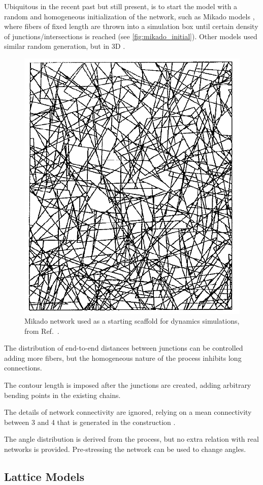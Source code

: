 Ubiquitous in the recent past but still present, is to start the model with a random and homogeneous initialization of the network, such as Mikado models \cite{wilhelm_elasticity_2003, astrom_microscopic_1994, schuster_investigating_2012, conti_cross-linked_2009, sharma_strain-controlled_2016, sharma_elastic_2013},
where fibers of fixed length are thrown into a simulation box until certain density of junctions/intersections is reached (see \autoref{fig:mikado_initial}). Other models used similar random generation, but in 3D \cite{astrom_strain_2008}.
\begin{figure}[ht]
  \centering
  \includegraphics[width=0.4\linewidth]{Figures/chapter-intro/mikado_initial.png}
  \caption{Mikado network used as a starting scaffold for dynamics simulations, from Ref.~\cite{astrom_microscopic_1994}.}
  \label{fig:mikado_initial}
\end{figure}

The distribution of end-to-end distances between junctions can be controlled adding more fibers, but the homogeneous nature of the process inhibits long connections.

The contour length is imposed after the junctions are created, adding arbitrary bending points in the existing chains.

The details of network connectivity are ignored, relying on a mean connectivity between 3 and 4 that is generated in the construction \cite{sharma_strain-controlled_2016}.

The angle distribution is derived from the process, but no extra relation with real networks is provided. Pre-stressing the network can be used to change angles.

\subsection{Lattice Models}%
\label{sub:lattice_models}

